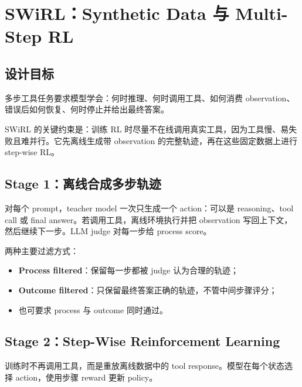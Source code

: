 \section{SWiRL：Synthetic Data 与 Multi-Step RL}

\subsection{设计目标}

多步工具任务要求模型学会：何时推理、何时调用工具、如何消费 observation、错误后如何恢复、何时停止并给出最终答案。



SWiRL 的关键约束是：训练 RL 时尽量不在线调用真实工具，因为工具慢、易失败且难并行。它先离线生成带 observation 的完整轨迹，再在这些固定数据上进行 step-wise RL。

\subsection{Stage 1：离线合成多步轨迹}

对每个 prompt，teacher model 一次只生成一个 action：可以是 reasoning、tool call 或 final answer。若调用工具，离线环境执行并把 observation 写回上下文，然后继续下一步。LLM judge 对每一步给 process score。


两种主要过滤方式：

\begin{itemize}
    \item \textbf{Process filtered}：保留每一步都被 judge 认为合理的轨迹；
    \item \textbf{Outcome filtered}：只保留最终答案正确的轨迹，不管中间步骤评分；
    \item 也可要求 process 与 outcome 同时通过。
\end{itemize}

\subsection{Stage 2：Step-Wise Reinforcement Learning}

训练时不再调用工具，而是重放离线数据中的 tool response。模型在每个状态选择 action，使用步骤 reward 更新 policy。

